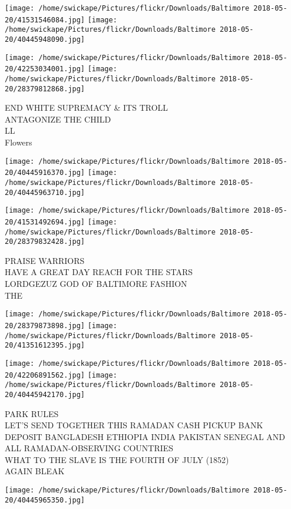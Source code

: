 \documentclass[10pt,letterpaper]{article}
\begin{document}
\texttt{[image: /home/swickape/Pictures/flickr/Downloads/Baltimore 2018-05-20/41531546084.jpg]}
\texttt{[image: /home/swickape/Pictures/flickr/Downloads/Baltimore 2018-05-20/40445948090.jpg]}

\texttt{[image: /home/swickape/Pictures/flickr/Downloads/Baltimore 2018-05-20/42253034001.jpg]}
\texttt{[image: /home/swickape/Pictures/flickr/Downloads/Baltimore 2018-05-20/28379812868.jpg]}

END WHITE SUPREMACY \& ITS TROLL\\
ANTAGONIZE THE CHILD\\
LL\\
Flowers
\pagebreak

\texttt{[image: /home/swickape/Pictures/flickr/Downloads/Baltimore 2018-05-20/40445916370.jpg]}
\texttt{[image: /home/swickape/Pictures/flickr/Downloads/Baltimore 2018-05-20/40445963710.jpg]}

\texttt{[image: /home/swickape/Pictures/flickr/Downloads/Baltimore 2018-05-20/41531492694.jpg]}
\texttt{[image: /home/swickape/Pictures/flickr/Downloads/Baltimore 2018-05-20/28379832428.jpg]}

PRAISE WARRIORS\\
HAVE A GREAT DAY REACH FOR THE STARS\\
LORDGEZUZ GOD OF BALTIMORE FASHION\\
THE
\pagebreak

\texttt{[image: /home/swickape/Pictures/flickr/Downloads/Baltimore 2018-05-20/28379873898.jpg]}
\texttt{[image: /home/swickape/Pictures/flickr/Downloads/Baltimore 2018-05-20/41351612395.jpg]}

\texttt{[image: /home/swickape/Pictures/flickr/Downloads/Baltimore 2018-05-20/42206891562.jpg]}
\texttt{[image: /home/swickape/Pictures/flickr/Downloads/Baltimore 2018-05-20/40445942170.jpg]}

PARK RULES\\
LET'S SEND TOGETHER THIS RAMADAN CASH PICKUP BANK DEPOSIT BANGLADESH ETHIOPIA INDIA PAKISTAN SENEGAL AND ALL RAMADAN{-}OBSERVING COUNTRIES\\
WHAT TO THE SLAVE IS THE FOURTH OF JULY (1852)\\
AGAIN BLEAK
\pagebreak

\texttt{[image: /home/swickape/Pictures/flickr/Downloads/Baltimore 2018-05-20/40445965350.jpg]}
\end{document}
